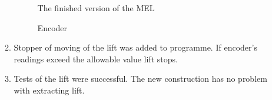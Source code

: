 \begin{enumerate}
\begin{enumerate}
      \begin{figure}[H]
      	\begin{minipage}[h]{0.47\linewidth}
      		\caption{The finished version of the MEL}
      	\end{minipage}
      	\hfill
      	\begin{minipage}[h]{0.47\linewidth}
      		\caption{Encoder}
      	\end{minipage}
      \end{figure}
      
      \item Stopper of moving of the lift was added to programme. If encoder's  readings exceed the allowable value lift stops.
      
      \item Tests of the lift were successful. The new construction has no problem with extracting lift.
      

\end{enumerate}
\end{enumerate}
